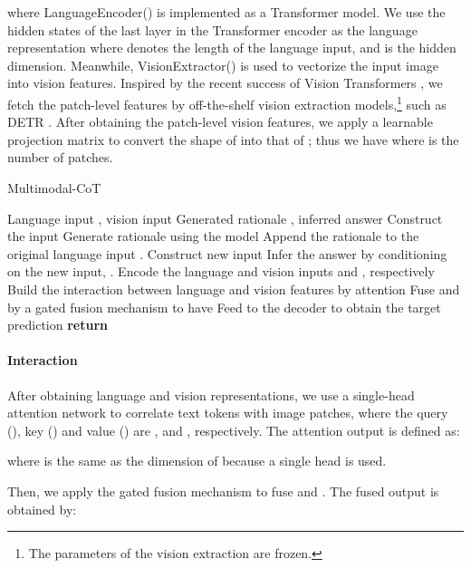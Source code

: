 \documentclass[nohyperref]{article}
\theoremstyle{plain}
\theoremstyle{definition}
\theoremstyle{remark}
\begin{document}
where \textrm{LanguageEncoder}() is implemented as a Transformer model. We use the hidden states of the last layer in the Transformer encoder as the language representation  where  denotes the length of the language input, and  is the hidden dimension.
Meanwhile, \textrm{VisionExtractor}() is used to vectorize the input image into vision features. Inspired by the recent success of Vision Transformers \citep{dosovitskiy2020image}, we fetch the patch-level features by off-the-shelf vision extraction models,\footnote{{The parameters of the vision extraction are frozen.}} such as DETR \citep{carion2020end}. After obtaining the patch-level vision features, we apply a learnable projection matrix  to convert the shape of  into that of ; thus we have  where  is the number of patches.

\begin{algorithm}[t]\small
    \caption{Multimodal-CoT}\label{alg:mm-cot}
    \begin{algorithmic}[1]
    \Require Language input , vision input 
    \Ensure Generated rationale , inferred answer 
    \State Construct the input 
    \State Generate rationale  using the model 
\State Append the rationale  to the original language input .
    \State Construct new input 
    \State Infer the answer  by conditioning on the new input, . 
    \State Encode the language and vision inputs  and , respectively 
    \State Build the interaction between language and vision features by attention 
    \State Fuse  and  by a gated fusion mechanism to have 
    \State Feed  to the decoder to obtain the target prediction 
    \State \textbf{return} 
    \EndProcedure \end{algorithmic}
    
\end{algorithm}
%
 
\paragraph{Interaction} After obtaining language and vision representations, we use a single-head attention network to correlate text tokens with image patches, where the query (), key () and value () are ,  and , respectively. The attention output  is defined as:


\noindent where  is the same as the dimension of  because a single head is used. 

Then, we apply the gated fusion mechanism \citep{zhang2020neural,wu2021good,li2022vision} to fuse  and . The fused output  is obtained by:
\end{document}
